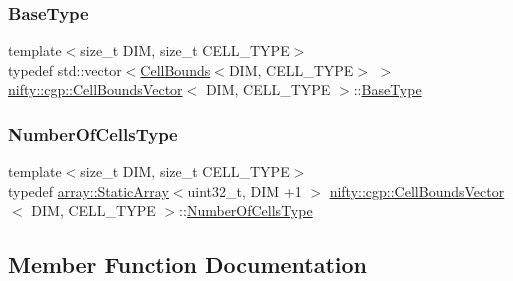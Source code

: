 \subsubsection{\texorpdfstring{Base\+Type}{BaseType}}
{\footnotesize\ttfamily template$<$size\+\_\+t D\+IM, size\+\_\+t C\+E\+L\+L\+\_\+\+T\+Y\+PE$>$ \\
typedef std\+::vector$<$\hyperlink{classnifty_1_1cgp_1_1CellBounds}{Cell\+Bounds}$<$D\+IM, C\+E\+L\+L\+\_\+\+T\+Y\+PE$>$ $>$ \hyperlink{classnifty_1_1cgp_1_1CellBoundsVector}{nifty\+::cgp\+::\+Cell\+Bounds\+Vector}$<$ D\+IM, C\+E\+L\+L\+\_\+\+T\+Y\+PE $>$\+::\hyperlink{classnifty_1_1cgp_1_1CellBoundsVector_ae9467b3782214101f6ca95a0219bbbb6}{Base\+Type}}

\mbox{\label{classnifty_1_1cgp_1_1CellBoundsVector_a4db6e267b7ec9e9bfd2db914354c49f9}} 
\subsubsection{\texorpdfstring{Number\+Of\+Cells\+Type}{NumberOfCellsType}}
{\footnotesize\ttfamily template$<$size\+\_\+t D\+IM, size\+\_\+t C\+E\+L\+L\+\_\+\+T\+Y\+PE$>$ \\
typedef \hyperlink{namespacenifty_1_1array_a683f151f19c851754e0c6d55ed16a0c2}{array\+::\+Static\+Array}$<$uint32\+\_\+t, D\+IM +1 $>$ \hyperlink{classnifty_1_1cgp_1_1CellBoundsVector}{nifty\+::cgp\+::\+Cell\+Bounds\+Vector}$<$ D\+IM, C\+E\+L\+L\+\_\+\+T\+Y\+PE $>$\+::\hyperlink{classnifty_1_1cgp_1_1CellBoundsVector_a4db6e267b7ec9e9bfd2db914354c49f9}{Number\+Of\+Cells\+Type}}



\subsection{Member Function Documentation}
\mbox{\label{classnifty_1_1cgp_1_1CellBoundsVector_a7e6c76f3f934b830d3d2ab964909dcf4}} 
